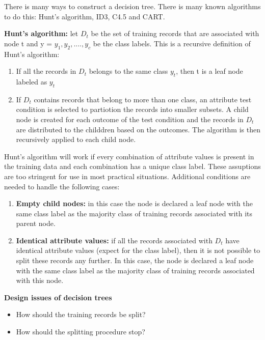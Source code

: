 		There is many ways to construct a decision tree. There is many known algorithms to
		do this: Hunt's algorithm, ID3, C4.5 and CART. 

\clearpage
		{\bf Hunt's algorithm:} let $D_{t}$ be the set of training records that are 
		associated with node t and y = {$y_{1}, y_{2}, ...., y_{c}$} be the class labels. 
		This is a recursive definition of Hunt's algorithm:
		\begin{enumerate}
			\item If all the records in $D_{t}$ belongs to the same class $y_{t}$, then
			t is a leaf node labeled as $y_{t}$
			\item If $D_{t}$ contains records that belong to more than one class, an
			attribute test condition is selected to partiotion the records into smaller
			subsets. A child node is created for each outcome of the test condition and 
			the records in $D_{t}$ are distributed to the childdren based on the outcomes. 
			The algorithm is then recursively applied to each child node. 
		\end{enumerate} 

		Hunt's algorithm will work if every combination of attribute values is present
		in the training data and each combination has a unique class label. 
		These assuptions are too stringent for use in most practical situations. 
		Additional conditions are needed to handle the following cases:

		\begin{enumerate}
			\item {\bf Empty child nodes:} in this case the node is declared a leaf
			node with the same class label as the majority class of training records
			associated with its parent node. 
			\item{\bf Identical attribute values:} if all the records associated with
			$D_{t}$ have identical attribute values (expect for the class label), then
			it is not possible to split these records any further. In this case, the node is
			declared a leaf node with the same class label as the majority class of 
			training records associated with this node.
		\end{enumerate}

		{\bf Design issues of decision trees}
			\begin{itemize}
				\item How should the training records be split?
				\item How should the splitting procedure stop?
			\end{itemize}

